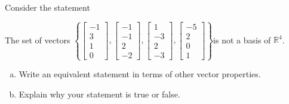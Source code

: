 
\begin{exerciseStatement}


Consider the statement 
\begin{center}\begin{minipage}{0.8\textwidth}
 The set of vectors \( \left\{ \left[\begin{array}{c}
-1 \\
3 \\
1 \\
0
\end{array}\right] , \left[\begin{array}{c}
-1 \\
-1 \\
2 \\
-2
\end{array}\right] , \left[\begin{array}{c}
1 \\
-3 \\
2 \\
-3
\end{array}\right] , \left[\begin{array}{c}
-5 \\
2 \\
0 \\
1
\end{array}\right] \right\} \)is not a basis of \(\mathbb{R}^4\). 
\end{minipage}\end{center}
    


\begin{enumerate}[(a)]
\item  Write an equivalent statement in terms of other vector properties.
\item  Explain why your statement is true or false.
\end{enumerate}
    
\end{exerciseStatement}
    
